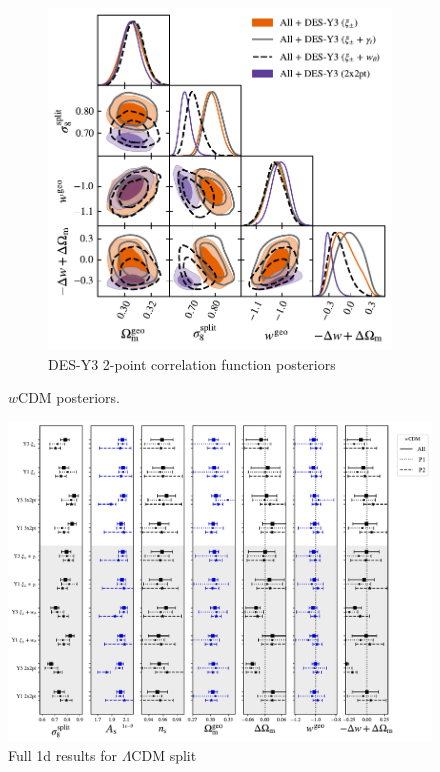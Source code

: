 \begin{figure}[ht]
\begin{subfigure}[b]{0.45\textwidth}
		\includegraphics[width=\textwidth]{plots/plot209.pdf}
		\caption{DES-Y3 2-point correlation function posteriors}
		\label{fig:y3_2x2_wcdm}
	\end{subfigure}
	\caption{$w$CDM posteriors.}
	\label{fig:wcdm_post}
\end{figure}
\begin{figure}[ht]
	\centering
	\includegraphics[width=\textwidth]{plots/plot_1d_resultv6.pdf}
	\caption{Full 1d results for $\Lambda$CDM split}
	\label{fig:wcdm_result_1d}
\end{figure}
